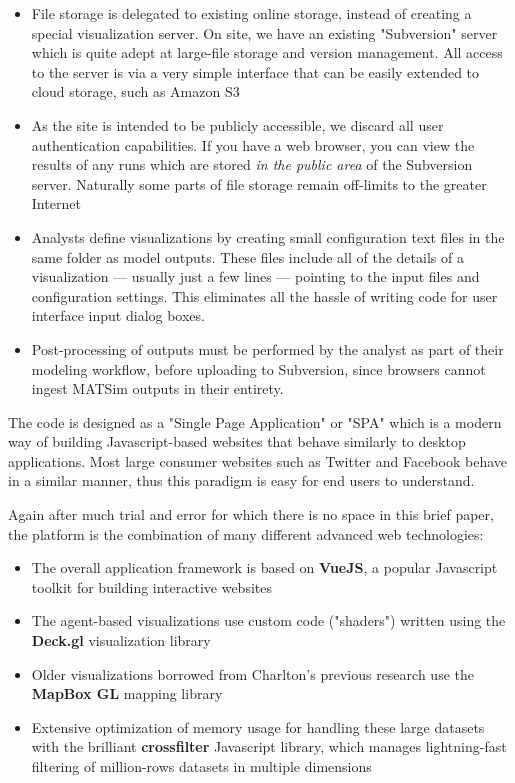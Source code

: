 \documentclass[3p,times,procedia]{elsarticle}
\begin{document}
\begin{itemize}
  \item File storage is delegated to existing online storage, instead of creating a special visualization server. On site, we have an existing "Subversion" server \cite{Collins-SussmanEtc2008SubversionBook} which is quite adept at large-file storage and version management. All access to the server is via a very simple interface that can be easily extended to cloud storage, such as Amazon S3
  \item As the site is intended to be publicly accessible, we discard all user authentication capabilities. If you have a web browser, you can view the results of any runs which are stored \emph{in the public area} of the Subversion server. Naturally some parts of file storage remain off-limits to the greater Internet
  \item Analysts define visualizations by creating small configuration text files in the same folder as model outputs. These files include all of the details of a visualization --- usually just a few lines --- pointing to the input files and configuration settings. This eliminates all the hassle of writing code for user interface input dialog boxes.
  \item Post-processing of outputs must be performed by the analyst as part of their modeling workflow, before uploading to Subversion, since browsers cannot ingest MATSim outputs in their entirety.
\end{itemize}

The code is designed as a "Single Page Application" or "SPA" which is a modern way of building Javascript-based websites that behave similarly to desktop applications. Most large consumer websites such as Twitter and Facebook behave in a similar manner, thus this paradigm is easy for end users to understand.

Again after much trial and error for which there is no space in this brief paper, the platform is the combination of many different advanced web technologies:

\begin{itemize}
  \item The overall application framework is based on \textbf{VueJS}, a popular Javascript toolkit for building interactive websites
  \item The agent-based visualizations use custom code ("shaders") written using the \textbf{Deck.gl} visualization library
  \item Older visualizations borrowed from Charlton's previous research use the \textbf{MapBox GL} mapping library
  \item Extensive optimization of memory usage for handling these large datasets with the brilliant \textbf{crossfilter} Javascript library, which manages lightning-fast filtering of million-rows datasets in multiple dimensions
\end{itemize}
\end{document}
